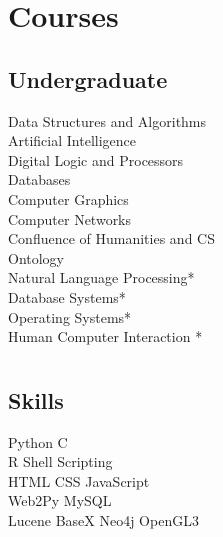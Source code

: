 \documentclass[]{deedy-resume-openfont}
\begin{document}
\begin{minipage}[t]{0.33\textwidth}
\section{Courses}


\subsection{Undergraduate}
Data Structures and Algorithms \\
Artificial Intelligence\\
Digital Logic and Processors\\
Databases \\
Computer Graphics \\
Computer Networks \\
Confluence of Humanities and CS \\
Ontology\\
Natural Language Processing*\\
Database Systems*\\
Operating Systems* \\
Human Computer Interaction *\\


\sectionsep


\section{}
\subsection{Skills}
Python \textbullet{} C \\ 
R \textbullet{} Shell Scripting \\
HTML \textbullet{} CSS \textbullet{} JavaScript \\
Web2Py \textbullet{} MySQL \\
Lucene \textbullet{} BaseX \textbullet{} Neo4j \textbullet{} OpenGL3 
\sectionsep


\section{}

\end{minipage}
\end{document}
